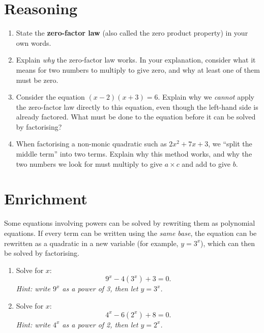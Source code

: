 \documentclass[11pt]{article}
\newcommand{\qspace}{\vspace{1.1cm}}
\begin{document}
\newpage
\section{Reasoning}

\begin{enumerate}
  \item State the \textbf{zero-factor law} (also called the zero product property) in your own words.
  \qspace

  \item Explain \emph{why} the zero-factor law works. In your explanation, consider what it means for two numbers to multiply to give zero, and why at least one of them must be zero.
  \qspace

  \item Consider the equation $(x-2)(x+3) = 6$. Explain why we \emph{cannot} apply the zero-factor law directly to this equation, even though the left-hand side is already factored. What must be done to the equation before it can be solved by factorising?
  \qspace

  \item When factorising a non-monic quadratic such as $2x^2 + 7x + 3$, we ``split the middle term'' into two terms. Explain why this method works, and why the two numbers we look for must multiply to give $a \times c$ and add to give $b$.
  \qspace
\end{enumerate}

\newpage
\section{Enrichment}

Some equations involving powers can be solved by rewriting them as polynomial equations. If every term can be written using the \emph{same base}, the equation can be rewritten as a quadratic in a new variable (for example, $y = 3^x$), which can then be solved by factorising.

\begin{enumerate}
  \item Solve for $x$:
  \[
    9^x - 4(3^x) + 3 = 0.
  \]
  \emph{Hint: write $9^x$ as a power of 3, then let $y = 3^x$.}
  \qspace

  \item Solve for $x$:
  \[
    4^x - 6(2^x) + 8 = 0.
  \]
  \emph{Hint: write $4^x$ as a power of 2, then let $y = 2^x$.}
  \qspace
\end{enumerate}
\end{document}
